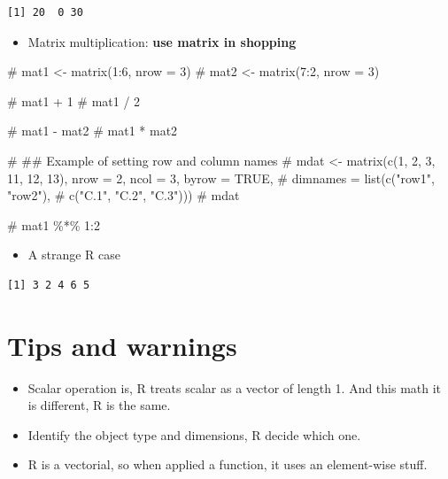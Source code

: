 \documentclass[
  letterpaper,
  DIV=11,
  numbers=noendperiod]{scrreprt}
\newenvironment{Shaded}{\begin{snugshade}}{\end{snugshade}}
\newcommand{\CommentTok}[1]{\textcolor[rgb]{0.37,0.37,0.37}{#1}}
\providecommand{\tightlist}{%
  \setlength{\itemsep}{0pt}\setlength{\parskip}{0pt}}
\begin{document}
\begin{verbatim}
[1] 20  0 30
\end{verbatim}

\begin{itemize}
\tightlist
\item
  Matrix multiplication: \textbf{use matrix in shopping}
\end{itemize}

\begin{Shaded}
\begin{Highlighting}[]
\CommentTok{\# mat1 \textless{}{-} matrix(1:6, nrow = 3)}
\CommentTok{\# mat2 \textless{}{-} matrix(7:2, nrow = 3)}

\CommentTok{\# mat1 + 1}
\CommentTok{\# mat1 / 2}

\CommentTok{\# mat1 {-} mat2}
\CommentTok{\# mat1 * mat2}

\CommentTok{\# \#\# Example of setting row and column names}
\CommentTok{\# mdat \textless{}{-} matrix(c(1, 2, 3, 11, 12, 13), nrow = 2, ncol = 3, byrow = TRUE,}
\CommentTok{\#                dimnames = list(c("row1", "row2"),}
\CommentTok{\#                                c("C.1", "C.2", "C.3")))}
\CommentTok{\# mdat}


\CommentTok{\# mat1 \%*\% 1:2}
\end{Highlighting}
\end{Shaded}

\begin{itemize}
\tightlist
\item
  A strange R case
\end{itemize}

\begin{verbatim}
[1] 3 2 4 6 5
\end{verbatim}

\section*{Tips and warnings}\label{tips-and-warnings-29}


\begin{itemize}
\tightlist
\item
  Scalar operation is, R treats scalar as a vector of length 1. And this
  math it is different, R is the same.
\item
  Identify the object type and dimensions, R decide which one.
\item
  R is a vectorial, so when applied a function, it uses an element-wise
  stuff.
\end{itemize}
\end{document}
